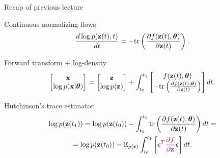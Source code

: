 \begin{frame}{Recap of previous lecture}
	\vspace{-0.5cm}
	\begin{block}{Continuous normalizing flows}
		\[
			\frac{d \log p(\mathbf{z}(t), t)}{d t} = - \text{tr} \left( \frac{\partial f (\mathbf{z}(t), \boldsymbol{\theta})}{\partial \mathbf{z}(t)} \right).
		\]
		\vspace{-0.5cm}
	\end{block}
	\begin{block}{Forward transform + log-density}
		\vspace{-0.4cm}
		\[
			\begin{bmatrix}
				\mathbf{x} \\
				\log p(\mathbf{x} | \boldsymbol{\theta})
			\end{bmatrix}
			= 
			\begin{bmatrix}
				\mathbf{z} \\
				\log p(\mathbf{z})
			\end{bmatrix} + 
			\int_{t_0}^{t_1} 
			\begin{bmatrix}
				f(\mathbf{z}(t), \boldsymbol{\theta}) \\
				- \text{tr} \left( \frac{\partial f(\mathbf{z}(t), \boldsymbol{\theta})}{\partial \mathbf{z}(t)} \right) 
			\end{bmatrix} dt.
		\]
		\vspace{-0.4cm}
	\end{block}	
	\begin{block}{Hutchinson's trace estimator}
		\vspace{-0.8cm}
		\begin{multline*}
		   \log p(\mathbf{z}(t_1)) = \log p(\mathbf{z}(t_0)) - \int_{t_0}^{t_1} \text{tr}  \left( \frac{\partial f (\mathbf{z}(t), \boldsymbol{\theta})}{\partial \mathbf{z}(t)} \right) dt = \\ = \log p(\mathbf{z}(t_0)) - \mathbb{E}_{p(\boldsymbol{\epsilon})} \int_{t_0}^{t_1} \left[ {\color{violet}\boldsymbol{\epsilon}^T \frac{\partial f}{\partial \mathbf{z}}} \boldsymbol{\epsilon} \right] dt.
		\end{multline*}
	\end{block}
\end{frame}
